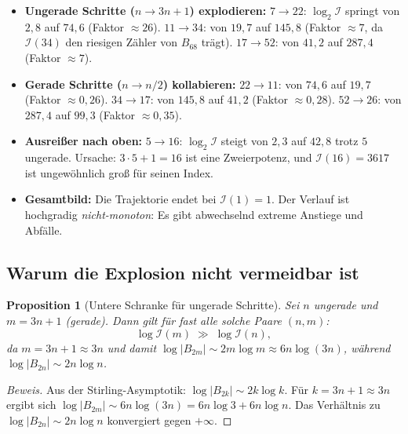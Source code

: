\documentclass[12pt,a4paper]{article}
\newtheorem{proposition}[definition]{Proposition}
\newenvironment{beweis}{\begin{proof}[Beweis]}{\end{proof}}
\newcommand{\abs}[1]{\lvert#1\rvert}
\newcommand{\In}{\mathcal{I}}      %
\begin{document}
\begin{tcolorbox}[bernoulli, title={Ablesungen aus der Tabelle}]
\begin{itemize}[leftmargin=*, noitemsep]
  \item \textbf{Ungerade Schritte ($n \to 3n+1$) explodieren:}
        $7 \to 22$: $\log_2 \In$ springt von $2{,}8$ auf $74{,}6$ (Faktor $\approx 26$).
        $11 \to 34$: von $19{,}7$ auf $145{,}8$ (Faktor $\approx 7$, da $\In(34)$
        den riesigen Zähler von $B_{68}$ trägt).
        $17 \to 52$: von $41{,}2$ auf $287{,}4$ (Faktor $\approx 7$).
  \item \textbf{Gerade Schritte ($n \to n/2$) kollabieren:}
        $22 \to 11$: von $74{,}6$ auf $19{,}7$ (Faktor $\approx 0{,}26$).
        $34 \to 17$: von $145{,}8$ auf $41{,}2$ (Faktor $\approx 0{,}28$).
        $52 \to 26$: von $287{,}4$ auf $99{,}3$ (Faktor $\approx 0{,}35$).
  \item \textbf{Ausreißer nach oben:} $5 \to 16$: $\log_2\In$ steigt von $2{,}3$
        auf $42{,}8$ trotz $5$ ungerade. Ursache: $3\cdot 5+1 = 16$ ist eine
        Zweierpotenz, und $\In(16) = 3617$ ist ungewöhnlich groß für seinen Index.
  \item \textbf{Gesamtbild:} Die Trajektorie endet bei $\In(1) = 1$.
        Der Verlauf ist hochgradig \emph{nicht-monoton}: Es gibt abwechselnd
        extreme Anstiege und Abfälle.
\end{itemize}
\end{tcolorbox}

\subsection{Warum die Explosion nicht vermeidbar ist}

\begin{proposition}[Untere Schranke für ungerade Schritte]
\label{prop:explosion}
Sei $n$ ungerade und $m = 3n+1$ (gerade). Dann gilt für fast alle solche Paare
$(n, m)$:
\[
  \log \In(m) \;\gg\; \log \In(n),
\]
da $m = 3n+1 \approx 3n$ und damit $\log\abs{B_{2m}} \sim 2m\log m \approx 6n\log(3n)$,
während $\log\abs{B_{2n}} \sim 2n\log n$.
\end{proposition}

\begin{beweis}
Aus der Stirling-Asymptotik: $\log\abs{B_{2k}} \sim 2k\log k$.
Für $k = 3n+1 \approx 3n$ ergibt sich
$\log\abs{B_{2m}} \sim 6n\log(3n) = 6n\log 3 + 6n\log n$.
Das Verhältnis zu $\log\abs{B_{2n}} \sim 2n\log n$ konvergiert gegen $+\infty$.
\end{beweis}
\end{document}

